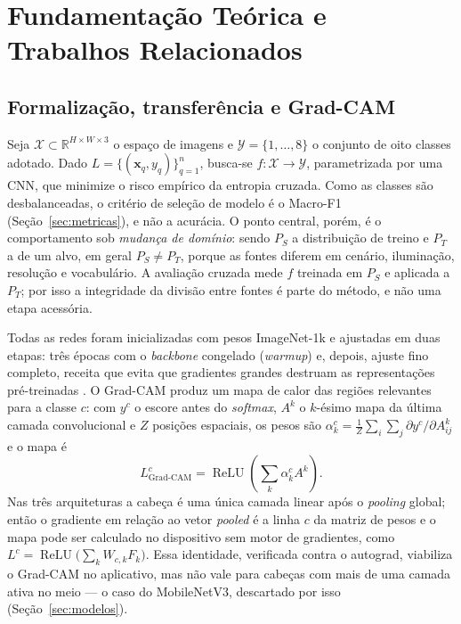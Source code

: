 \documentclass[11pt,a4paper]{article}
\begin{document}
	\section{Fundamentação Teórica e Trabalhos Relacionados}
	\label{sec:background}
	
	\subsection{Formalização, transferência e Grad-CAM}
	
	Seja $\mathcal{X} \subset \mathbb{R}^{H \times W \times 3}$ o espaço de imagens e $\mathcal{Y} = \{1, \dots, 8\}$ o conjunto de oito classes adotado. Dado $L = \{(\mathbf{x}_q, y_q)\}_{q=1}^{n}$, busca-se $f : \mathcal{X} \rightarrow \mathcal{Y}$, parametrizada por uma CNN, que minimize o risco empírico da entropia cruzada. Como as classes são desbalanceadas, o critério de seleção de modelo é o Macro-F1 (Seção~\ref{sec:metricas}), e não a acurácia. O ponto central, porém, é o comportamento sob \emph{mudança de domínio}: sendo $P_S$ a distribuição de treino e $P_T$ a de um alvo, em geral $P_S \neq P_T$, porque as fontes diferem em cenário, iluminação, resolução e vocabulário. A avaliação cruzada mede $f$ treinada em $P_S$ e aplicada a $P_T$; por isso a integridade da divisão entre fontes é parte do método, e não uma etapa acessória.
	
	Todas as redes foram inicializadas com pesos ImageNet-1k e ajustadas em duas etapas: três épocas com o \textit{backbone} congelado (\emph{warmup}) e, depois, ajuste fino completo, receita que evita que gradientes grandes destruam as representações pré-treinadas \cite{howardruder2018}. O Grad-CAM \cite{selvaraju2017} produz um mapa de calor das regiões relevantes para a classe $c$: com $y^c$ o escore antes do \textit{softmax}, $A^k$ o $k$-ésimo mapa da última camada convolucional e $Z$ posições espaciais, os pesos são $\alpha_k^c = \frac{1}{Z}\sum_{i}\sum_{j} \partial y^c / \partial A^k_{ij}$ e o mapa é
	\begin{equation}
		L^c_{\text{Grad-CAM}} = \operatorname{ReLU}\!\left( \sum_{k} \alpha_k^c A^k \right).
		\label{eq:gradcam}
	\end{equation}
	Nas três arquiteturas a cabeça é uma única camada linear após o \emph{pooling} global; então o gradiente em relação ao vetor \emph{pooled} é a linha $c$ da matriz de pesos e o mapa pode ser calculado no dispositivo sem motor de gradientes, como $L^c = \operatorname{ReLU}\big(\sum_{k} W_{c,k} F_k\big)$. Essa identidade, verificada contra o autograd, viabiliza o Grad-CAM no aplicativo, mas não vale para cabeças com mais de uma camada ativa no meio --- o caso do MobileNetV3, descartado por isso (Seção~\ref{sec:modelos}).
	
\end{document}
